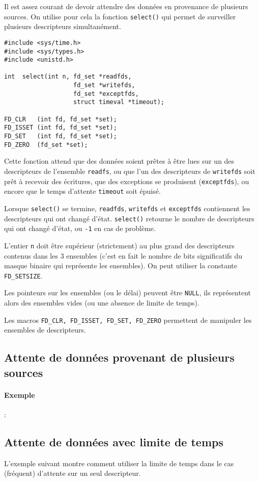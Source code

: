 Il est assez courant de devoir attendre des données en provenance
de plusieurs sources. On utilise pour cela la fonction \texttt{select()} qui
permet de surveiller plusieurs descripteurs simultanément.


\extrait
\begin{lstlisting}
#include <sys/time.h>
#include <sys/types.h>
#include <unistd.h>

int  select(int n, fd_set *readfds, 
                   fd_set *writefds, 
                   fd_set *exceptfds, 
                   struct timeval *timeout);

FD_CLR   (int fd, fd_set *set);
FD_ISSET (int fd, fd_set *set);
FD_SET   (int fd, fd_set *set);
FD_ZERO  (fd_set *set);      
\end{lstlisting}


Cette fonction attend que des données soient prêtes à être lues sur un
des descripteurs de l'ensemble \texttt{readfs}, ou que l'un des
descripteurs de \texttt{writefds} soit prêt à recevoir des écritures,
que des exceptions se produisent (\texttt{exceptfds}), ou encore que
le temps d'attente \texttt{timeout} soit épuisé.  

 
Lorsque
\texttt{select()} se termine, \texttt{readfds}, \texttt{writefds} et
\texttt{exceptfds} contiennent les descripteurs qui ont changé d'état.
\texttt{select()} retourne le nombre de descripteurs qui ont changé
d'état, ou \texttt{-1} en cas de problème.
 
L'entier \texttt{n} doit être
supérieur (strictement) au plus grand des descripteurs contenus dans
les 3 ensembles (c'est en fait le nombre de bits significatifs du
masque binaire qui représente les ensembles). On peut utiliser la
constante \texttt{FD\_SETSIZE}.
 
Les pointeurs sur les ensembles (ou
le délai) peuvent être \texttt{NULL}, ils représentent alors des
ensembles vides (ou une absence de limite de temps).



Les macros \texttt{FD\_CLR, FD\_ISSET, FD\_SET, FD\_ZERO} permettent de 
manipuler les ensembles de descripteurs. 


\subsection{Attente de données provenant de plusieurs sources}

\paragraph*{Exemple} :

\source



\subsection{Attente de données avec limite de temps}

L'exemple suivant montre comment utiliser la limite de temps dans le
cas (fréquent) d'attente sur un seul descripteur.

\source



